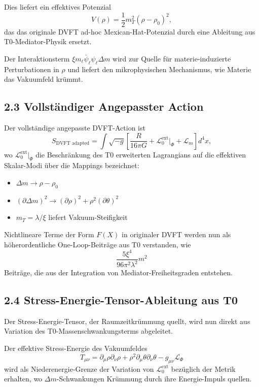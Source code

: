 \documentclass[12pt,a4paper]{article}
\begin{document}
	Dies liefert ein effektives Potenzial
	\[
	V(\rho) = \frac{1}{2} m_T^2 (\rho - \rho_0)^2,
	\]
	das das originale DVFT ad-hoc Mexican-Hat-Potenzial durch eine Ableitung aus T0-Mediator-Physik ersetzt.
	
	Der Interaktionsterm $\xi m_\ell \bar{\psi}_\ell \psi_\ell \Delta m$ wird zur Quelle für materie-induzierte Perturbationen in $\rho$ und liefert den mikrophysischen Mechanismus, wie Materie das Vakuumfeld krümmt.
	
	\subsection{2.3 Vollständiger Angepasster Action}
	
	Der vollständige angepasste DVFT-Action ist
	\[
	S_{\text{DVFT adapted}} = \int \sqrt{-g} \left[ \frac{R}{16\pi G} + \mathcal{L}_0^{\text{ext}} \big|_{\Phi} + \mathcal{L}_m \right] d^4x,
	\]
	wo $\mathcal{L}_0^{\text{ext}} \big|_{\Phi}$ die Beschränkung des T0 erweiterten Lagrangians auf die effektiven Skalar-Modi über die Mappings bezeichnet:
	\begin{itemize}
		\item $\Delta m \to \rho - \rho_0$
		\item $(\partial \Delta m)^2 \to (\partial \rho)^2 + \rho^2 (\partial \theta)^2$
		\item $m_T = \lambda / \xi$ liefert Vakuum-Steifigkeit
	\end{itemize}
	
	Nichtlineare Terme der Form $F(X)$ in originaler DVFT werden nun als höherordentliche One-Loop-Beiträge aus T0 verstanden, wie
	\[
	\frac{5\xi^4}{96\pi^2 \lambda^2} m^2
	\]
	Beiträge, die aus der Integration von Mediator-Freiheitsgraden entstehen.
	
	\subsection{2.4 Stress-Energie-Tensor-Ableitung aus T0}
	
	Der Stress-Energie-Tensor, der Raumzeitkrümmung quellt, wird nun direkt aus Variation des T0-Massenschwankungsterms abgeleitet.
	
	Der effektive Stress-Energie des Vakuumfeldes
	\[
	T_{\mu\nu} = \partial_\mu \rho \partial_\nu \rho + \rho^2 \partial_\mu \theta \partial_\nu \theta - g_{\mu\nu} \mathcal{L}_{\Phi}
	\]
	wird als Niederenergie-Grenze der Variation von $\mathcal{L}_0^{\text{ext}}$ bezüglich der Metrik erhalten, wo $\Delta m$-Schwankungen Krümmung durch ihre Energie-Impuls quellen.
	
\end{document}

